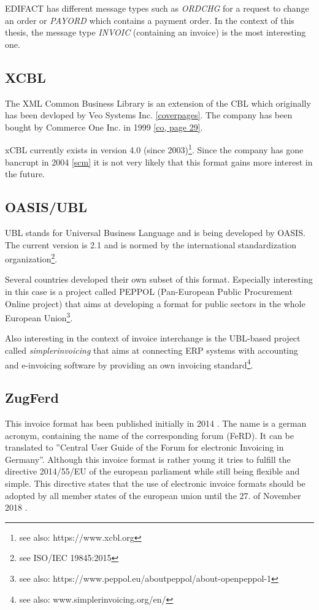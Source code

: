 \documentclass[english,mt]{lmedoc}
\begin{document}
EDIFACT has different message types such as \emph{ORDCHG} for a request to change an order or \emph{PAYORD} which contains a payment order. In the context of this thesis, the message type \emph{INVOIC} (containing an invoice) is the most interesting one.

\subsection{XCBL}
\label{sec2.1.2}

The XML Common Business Library is an extension of the CBL which originally has been devloped by Veo Systems Inc. \ref{coverpages}. The company has been bought by Commerce One Inc. in 1999 \ref{co, page 29}. 

xCBL currently exists in version 4.0 (since 2003)\footnote{see also: https://www.xcbl.org}. Since the company has gone bancrupt in 2004 \ref{scm} it is not very likely that this format gains more interest in the future.

\subsection{OASIS/UBL}
\label{sec2.1.3}

UBL stands for Universal Business Language and is being developed by OASIS. The current version is 2.1 and is normed by the international standardization organization\footnote{see ISO/IEC 19845:2015}.

Several countries developed their own subset of this format. Especially interesting in this case is a project called PEPPOL (Pan-European Public Procurement Online project) that aims at developing a format for public sectors in the whole European Union\footnote {see also: https://www.peppol.eu/about\textunderscore peppol/about-openpeppol-1}. 

Also interesting in the context of invoice interchange is the UBL-based project called \emph{simplerinvoicing} that aims at connecting ERP systems with accounting and e-invoicing software by providing an own invoicing standard\footnote {see also: www.simplerinvoicing.org/en/}. 

\subsection{ZugFerd}
\label{sec.2.1.4}

This invoice format has been published initially in 2014 \cite{ferdIntro}. The name is a german acronym, containing the name of the corresponding forum (FeRD). It can be translated to ''Central User Guide of the Forum for electronic Invoicing in Germany''. 
Although this invoice format is rather young it tries to fulfill the directive 2014/55/EU of the european parliament \cite{dir1455} while still being flexible and simple. This directive states that the use of electronic invoice formats should be adopted by all member states of the european union until the 27. of November 2018 \cite{dir1455, Article 11}. 
 
\end{document}
